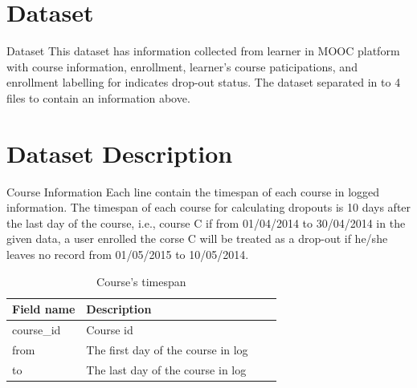 \documentclass[10pt]{beamer}
\title{\SNATopicEN}
\subtitle{Project Structure, Features and Model}
\author{Sitdhibong Laokok}
\institute{Srinakharinwirot University}
\begin{document}
    \begin{frame}
        \titlepage
    \end{frame}

    \section[Dataset]{Dataset}
    \begin{frame}[fragile]{Dataset}
        This dataset has information collected from learner in MOOC platform with
        course information, enrollment, learner's course paticipations,
        and enrollment labelling for indicates drop-out status. 
        The dataset separated in to 4 files to contain an information above.
    \end{frame}

    \section[Dataset Description]{Dataset Description}
    \begin{frame}[fragile]{Course Information}
        Each line contain the timespan of each course in logged information. 
        The timespan of each course for calculating dropouts is 10 days after the last day of the course, i.e.,
        course C if from 01/04/2014 to 30/04/2014 in the given data, 
        a user enrolled the corse C will be treated as a drop-out if he/she leaves no record from 01/05/2015 to 10/05/2014.
        \begin{table}
            \caption{\label{tab:course-info}Course's timespan}
            \begin{tabular}{l*{2}{l}r}
                Field name  & Description \\
                \hline
                course\_id  & Course id \\
                from        & The first day of the course in log \\
                to          & The last day of the course in log \\
            \end{tabular}
        \end{table}

    \end{frame}
\end{document}
